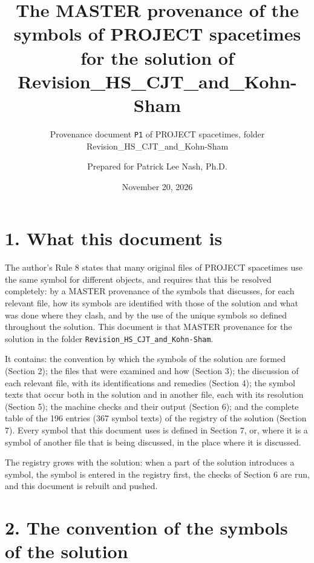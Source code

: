 \documentclass[
  10pt,
]{article}
\title{The MASTER provenance of the symbols of PROJECT spacetimes for
the solution of Revision\_HS\_CJT\_and\_Kohn-Sham}
\subtitle{Provenance document \texttt{P1} of PROJECT spacetimes, folder
Revision\_HS\_CJT\_and\_Kohn-Sham}
\author{Prepared for Patrick Lee Nash, Ph.D.}
\date{November 20, 2026}
\begin{document}
\maketitle

\hypertarget{what-this-document-is}{%
\section{1. What this document is}\label{what-this-document-is}}

The author's Rule 8 states that many original files of PROJECT
spacetimes use the same symbol for different objects, and requires that
this be resolved completely: by a MASTER provenance of the symbols that
discusses, for each relevant file, how its symbols are identified with
those of the solution and what was done where they clash, and by the use
of the unique symbols so defined throughout the solution. This document
is that MASTER provenance for the solution in the folder
\texttt{Revision\_HS\_CJT\_and\_Kohn-Sham}.

It contains: the convention by which the symbols of the solution are
formed (Section 2); the files that were examined and how (Section 3);
the discussion of each relevant file, with its identifications and
remedies (Section 4); the symbol texts that occur both in the solution
and in another file, each with its resolution (Section 5); the machine
checks and their output (Section 6); and the complete table of the 196
entries (367 symbol texts) of the registry of the solution (Section 7).
Every symbol that this document uses is defined in Section 7, or, where
it is a symbol of another file that is being discussed, in the place
where it is discussed.

The registry grows with the solution: when a part of the solution
introduces a symbol, the symbol is entered in the registry first, the
checks of Section 6 are run, and this document is rebuilt and pushed.

\hypertarget{the-convention-of-the-symbols-of-the-solution}{%
\section{2. The convention of the symbols of the
solution}\label{the-convention-of-the-symbols-of-the-solution}}
\end{document}
